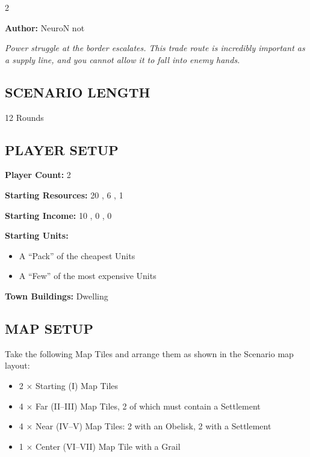 
\begin{multicols*}{2}

\textbf{Author:} NeuroN not

\textit{Power struggle at the border escalates. This trade route is incredibly important as a supply line, and you cannot allow it to fall into enemy hands.}

\subsection*{\MakeUppercase{Scenario Length}}
12 Rounds

\subsection*{\MakeUppercase{Player Setup}}
\textbf{Player Count:} 2

\textbf{Starting Resources:} 20 , 6 , 1 

\textbf{Starting Income:} 10 , 0 , 0 

\textbf{Starting Units:}

\begin{itemize}
  \item A ``Pack'' of the cheapest  Units
  \item A ``Few'' of the most expensive  Units
\end{itemize}

\textbf{Town Buildings:}  Dwelling

\subsection*{\MakeUppercase{Map Setup}}

Take the following Map Tiles and arrange them as shown in the Scenario map layout:

\begin{itemize}
  \item 2 × Starting (I) Map Tiles
  \item 4 × Far (II--III) Map Tiles, 2 of which must contain a Settlement
  \item 4 × Near (IV--V) Map Tiles: 2 with an Obelisk, 2 with a Settlement
  \item 1 × Center (VI--VII) Map Tile with a Grail
\end{itemize}


\end{multicols*}
